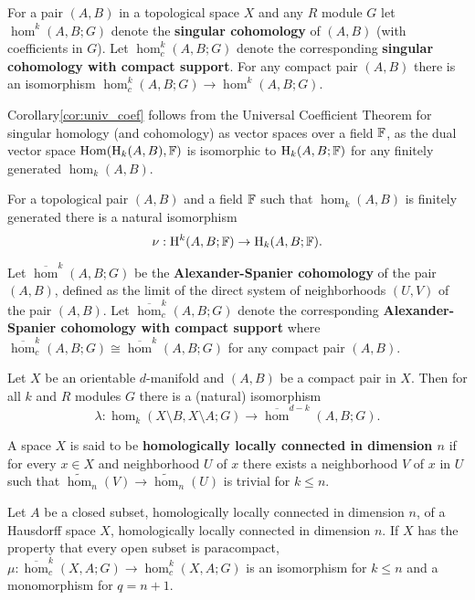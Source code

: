 
For a pair $(A, B)$ in a topological space $X$ and any $R$ module $G$ let $\hom^k(A, B; G)$ denote the \textbf{singular cohomology} of $(A,B)$ (with coefficients in $G$).
Let $\hom^k_c(A, B; G)$ denote the corresponding \textbf{singular cohomology with compact support}.
For any compact pair $(A,B)$ there is an isomorphism $\hom^k_c(A, B; G)\to\hom^k(A, B; G)$.

Corollary\ref{cor:univ_coef} follows from the Universal Coefficient Theorem for singular homology (and cohomology) as vector spaces over a field $\mathbb{F}$, as the dual vector space $\mathrm{Hom}(\mathrm{H}_k(A, B), \mathbb{F})$ is isomorphic to $\mathrm{H}_k(A, B; \mathbb{F})$ for any finitely generated $\hom_k(A, B)$.

\begin{corollary}\label{cor:univ_coef}
  For a topological pair $(A, B)$ and a field $\mathbb{F}$ such that $\hom_k(A, B)$ is finitely generated there is a natural isomorphism
  \[\nu : \mathrm{H}^k(A, B; \mathbb{F})\to \mathrm{H}_k(A, B; \mathbb{F}).\]
\end{corollary}

Let $\overline{\hom}^k(A, B; G)$ be the \textbf{Alexander-Spanier cohomology} of the pair $(A,B)$, defined as the limit of the direct system of neighborhoods $(U,V)$ of the pair $(A, B)$.
Let $\overline{\hom}^k_c(A, B; G)$ denote the corresponding \textbf{Alexander-Spanier cohomology with compact support} where $\overline{\hom}^k_c(A, B; G)\cong\overline{\hom}^k(A, B; G)$ for any compact pair $(A, B)$.

\begin{theorem}\label{thm:alexander}
  Let $X$ be an orientable $d$-manifold and $(A, B)$ be a compact pair in $X$.
  Then for all $k$ and $R$ modules $G$ there is a (natural) isomorphism
  \[\lambda : \hom_k(X\setminus B, X\setminus A; G)\to \overline{\hom}^{d-k}(A, B; G).\]
\end{theorem}

A space $X$ is said to be \textbf{homologically locally connected in dimension $n$} if for every $x\in X$ and neighborhood $U$ of $x$ there exists a neighborhood $V$ of $x$ in $U$ such that $\tilde{\hom}_n(V)\to\tilde{\hom}_n(U)$ is trivial for $k\leq n$.

\begin{lemma}\label{lem:alexander_iso}
  Let $A$ be a closed subset, homologically locally connected in dimension $n$, of a Hausdorff space $X$, homologically locally connected in dimension $n$.
  If $X$ has the property that every open subset is paracompact, $\mu : \overline{\hom}_c^k(X,A; G)\to \hom_c^k(X, A; G)$ is an isomorphism for $k\leq n$ and a monomorphism for $q = n+1$.
\end{lemma}

